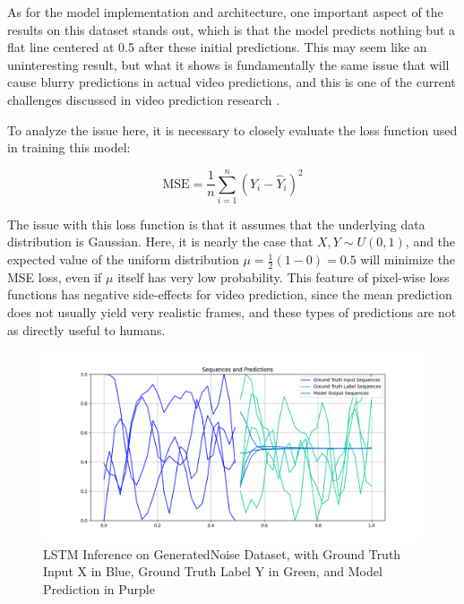 \documentclass{scrartcl}
\begin{document}
As for the model implementation and architecture, one important aspect of the
results on this dataset stands out, which is that the model predicts nothing
but a flat line centered at 0.5 after these initial predictions. This may seem
like an uninteresting result, but what it shows is fundamentally the same issue
that will cause blurry predictions in actual video predictions, and this is one
of the current challenges discussed in video prediction research
\cite{video_prediction_survey}.

To analyze the issue here, it is necessary to closely evaluate the loss
function used in training this model:

\begin{equation}
	\text{MSE} = \frac{1}{n} \sum_{i = 1}^n ( Y_i - \hat{Y}_i )^2
	 \label{eq:mseloss}
\end{equation}

The issue with this loss function is that it assumes that the underlying data
distribution is Gaussian. Here, it is nearly the case that $X, Y \sim U(0, 1)$,
and the expected value of the uniform distribution $\mu = \frac{1}{2} (1 - 0) =
0.5$ will minimize the MSE loss, even if $\mu$ itself has very low probability.
This feature of pixel-wise loss functions has negative side-effects for video
prediction, since the mean prediction does not usually yield very realistic
frames, and these types of predictions are not as directly useful to humans.
 
\begin{figure}[H]
	\centering
	\includegraphics[width=1\textwidth]{inferences/noise/3layer_s13.png}
	\caption{LSTM Inference on GeneratedNoise Dataset, with Ground Truth Input X in Blue, Ground Truth Label Y in Green, and Model Prediction in Purple}
	\label{inf:lstm_noise_inference}
\end{figure}

\end{document}

